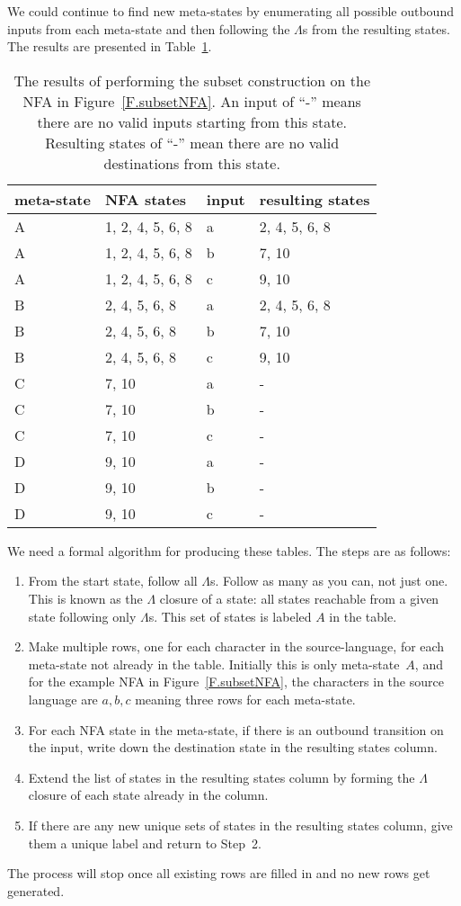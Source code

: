 \documentclass[letterpaper,12pt,openany,reqno]{book}%
\begin{document}
We could continue to find new meta-states by enumerating all possible outbound inputs from each meta-state and then following the $\Lambda$s from the resulting states. The results are presented in Table~\ref{T.subsetTable1}.

\begin{table}[hbt]
\center
\begin{tabular}{l|l|l|l}
\hline
\textbf{meta-state} & \textbf{NFA states} & \textbf{input} & \textbf{resulting states} \\
\hline
A & 1, 2, 4, 5, 6, 8 & a & 2, 4, 5, 6, 8 \\
A & 1, 2, 4, 5, 6, 8 & b & 7, 10 \\
A & 1, 2, 4, 5, 6, 8 & c & 9, 10 \\
B & 2, 4, 5, 6, 8 & a & 2, 4, 5, 6, 8 \\
B & 2, 4, 5, 6, 8 & b & 7, 10 \\
B & 2, 4, 5, 6, 8 & c & 9, 10 \\
C & 7, 10 & a & - \\
C & 7, 10 & b & - \\
C & 7, 10 & c & - \\
D & 9, 10 & a & - \\
D & 9, 10 & b & - \\
D & 9, 10 & c & - \\
\hline
\end{tabular}
\caption[Result of subset construction]{The results of performing the subset construction on the NFA in Figure~\ref{F.subsetNFA}. An input of ``-'' means there are no valid inputs starting from this state. Resulting states of ``-'' mean there are no valid destinations from this state.}
\label{T.subsetTable1}
\end{table}

We need a formal algorithm for producing these tables. The steps are as follows:
\begin{enumerate}
\item From the start state, follow all $\Lambda$s. Follow as many as you can, not just one. This is known as the $\Lambda$ closure of a state: all states reachable from a given state following only $\Lambda$s. This set of states is labeled $A$ in the table.
\item Make multiple rows, one for each character in the source-language, for each meta-state not already in the table. Initially this is only meta-state~$A$, and for the example NFA in Figure~\ref{F.subsetNFA}, the characters in the source language are $a, b, c$ meaning three rows for each meta-state.
\item For each NFA state in the meta-state, if there is an outbound transition on the input, write down the destination state in the resulting states column.
\item Extend the list of states in the resulting states column by forming the $\Lambda$ closure of each state already in the column.
\item If there are any new unique sets of states in the resulting states column, give them a unique label and return to Step~2.
\end{enumerate}
The process will stop once all existing rows are filled in and no new rows get generated.
\end{document}
